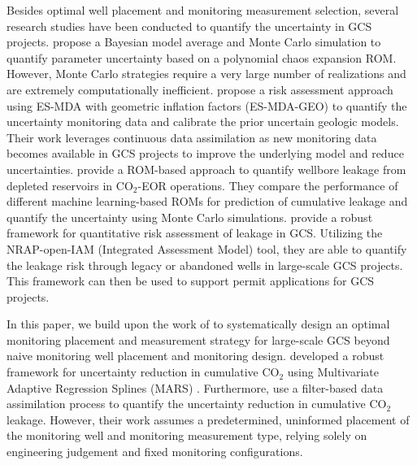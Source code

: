 \documentclass[a4paper,fleqn]{cas-sc}
\begin{document}
Besides optimal well placement and monitoring measurement selection, several research studies have been conducted to quantify the uncertainty in GCS projects. \citet{Jia2018104} propose a Bayesian model average and Monte Carlo simulation to quantify parameter uncertainty based on a polynomial chaos expansion ROM. However, Monte Carlo strategies require a very large number of realizations and are extremely computationally inefficient. \citet{Chen2020} propose a risk assessment approach using ES-MDA with geometric inflation factors (ES-MDA-GEO) to quantify the uncertainty monitoring data and calibrate the prior uncertain geologic models. Their work leverages continuous data assimilation as new monitoring data becomes available in GCS projects to improve the underlying model and reduce uncertainties. \citet{Mehana2022} provide a ROM-based approach to quantify wellbore leakage from depleted reservoirs in CO$_2$-EOR operations. They compare the performance of different machine learning-based ROMs for prediction of cumulative leakage and quantify the uncertainty using Monte Carlo simulations. \citet{Pawar2022} provide a robust framework for quantitative risk assessment of leakage in GCS. Utilizing the NRAP-open-IAM (Integrated Assessment Model) tool, they are able to quantify the leakage risk through legacy or abandoned wells in large-scale GCS projects. This framework can then be used to support permit applications for GCS projects. 

In this paper, we build upon the work of \citet{Chen2018} to systematically design an optimal monitoring placement and measurement strategy for large-scale GCS beyond naive monitoring well placement and monitoring design. \citet{Chen2018} developed a robust framework for uncertainty reduction in cumulative CO$_2$ using Multivariate Adaptive Regression Splines (MARS) \citep{Friedman19911}. Furthermore, \citet{Chen2018} use a filter-based data assimilation process to quantify the uncertainty reduction in cumulative CO$_2$ leakage. However, their work assumes a predetermined, uninformed placement of the monitoring well and monitoring measurement type, relying solely on engineering judgement and fixed monitoring configurations.
\end{document}
